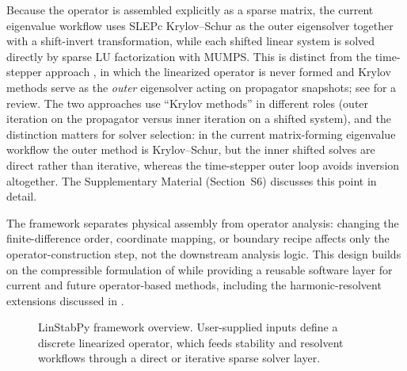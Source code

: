 \documentclass[10pt]{article}
\begin{document}
Because the operator is assembled explicitly as a sparse matrix, the current
eigenvalue workflow uses SLEPc Krylov--Schur as the outer eigensolver together
with a shift-invert transformation, while each shifted linear system is solved
directly by sparse LU factorization with MUMPS. This is distinct from the
time-stepper approach \citep{edwards1994krylov,barkley2008direct}, in which
the linearized operator is never formed and Krylov methods serve as the
\emph{outer} eigensolver acting on propagator snapshots; see
\citet{frantz2023krylov} for a review. The two approaches use ``Krylov
methods'' in different roles (outer iteration on the propagator versus inner
iteration on a shifted system), and the distinction matters for solver
selection: in the current matrix-forming eigenvalue workflow the outer method
is Krylov--Schur, but the inner shifted solves are direct rather than
iterative, whereas the time-stepper outer loop avoids inversion altogether.
The Supplementary Material (Section~S6) discusses this point in detail.

The framework separates physical assembly from operator analysis: changing the
finite-difference order, coordinate mapping, or boundary recipe affects only
the operator-construction step, not the downstream analysis logic. This design
builds on the compressible formulation of \citet{martini2024} while providing
a reusable software layer for current and future operator-based methods,
including the harmonic-resolvent extensions discussed in
\citet{padovan2020harmonic,padovan2022subharmonic,farghadan2025timestepping}.

\begin{figure}[t]
\centering
{}
\caption{LinStabPy framework overview. User-supplied inputs define a discrete
linearized operator, which feeds stability and resolvent workflows through
a direct or iterative sparse solver layer.}
\label{fig:framework}
\end{figure}
\end{document}
